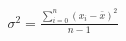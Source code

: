 \documentclass[10pt]{article}
\begin{document}
\begin{align*}\sigma^2 = \frac{\sum\limits_{i=0}^n (x_i - \bar{x})^2}{n-1}\end{align*}
\end{document}
